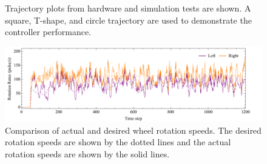 \documentclass[conference]{../IEEEtran}
\begin{document}
\begin{figure}[t]
  \centering
  \caption{Trajectory plots from hardware and simulation tests are shown. A square, T-shape, and circle trajectory are used to demonstrate the controller performance.}
  \label{fig:trajectories}
\end{figure}


\begin{figure}[t]
\centering
\includegraphics[width=18cm]{figures/pid_err.pdf}
\caption{Comparison of actual and desired wheel rotation speeds. The desired rotation
         speeds are shown by the dotted lines and the actual rotation speeds are
         shown by the solid lines.}
\label{fig:pid_err}
\end{figure}
\end{document}
